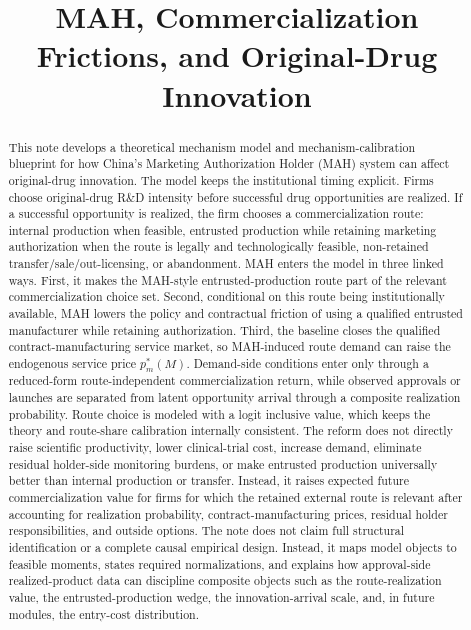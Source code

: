 \documentclass[12pt]{article}
\title{MAH, Commercialization Frictions, and Original-Drug Innovation}
\author{}
\date{}
\newcommand{\1}{\mathbf{1}}
\begin{document}
\maketitle
\thispagestyle{plain}

\begin{abstract}
\noindent
This note develops a theoretical mechanism model and mechanism-calibration blueprint for how China's Marketing Authorization Holder (MAH) system can affect original-drug innovation. The model keeps the institutional timing explicit. Firms choose original-drug R\&D intensity before successful drug opportunities are realized. If a successful opportunity is realized, the firm chooses a commercialization route: internal production when feasible, entrusted production while retaining marketing authorization when the route is legally and technologically feasible, non-retained transfer/sale/out-licensing, or abandonment. MAH enters the model in three linked ways. First, it makes the MAH-style entrusted-production route part of the relevant commercialization choice set. Second, conditional on this route being institutionally available, MAH lowers the policy and contractual friction of using a qualified entrusted manufacturer while retaining authorization. Third, the baseline closes the qualified contract-manufacturing service market, so MAH-induced route demand can raise the endogenous service price $p_m^*(M)$. Demand-side conditions enter only through a reduced-form route-independent commercialization return, while observed approvals or launches are separated from latent opportunity arrival through a composite realization probability. Route choice is modeled with a logit inclusive value, which keeps the theory and route-share calibration internally consistent. The reform does not directly raise scientific productivity, lower clinical-trial cost, increase demand, eliminate residual holder-side monitoring burdens, or make entrusted production universally better than internal production or transfer. Instead, it raises expected future commercialization value for firms for which the retained external route is relevant after accounting for realization probability, contract-manufacturing prices, residual holder responsibilities, and outside options. The note does not claim full structural identification or a complete causal empirical design. Instead, it maps model objects to feasible moments, states required normalizations, and explains how approval-side realized-product data can discipline composite objects such as the route-realization value, the entrusted-production wedge, the innovation-arrival scale, and, in future modules, the entry-cost distribution.
\end{abstract}
\end{document}
